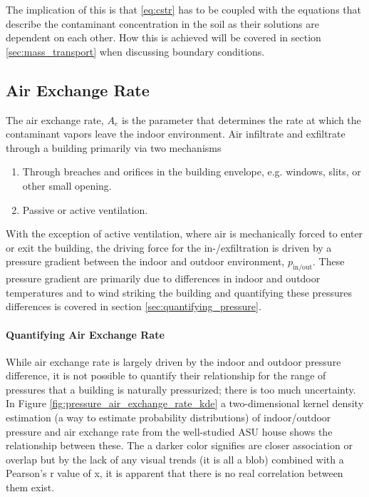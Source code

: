The implication of this is that \eqref{eq:cstr} has to be coupled with the equations that describe the contaminant concentration in the soil as their solutions are dependent on each other.
How this is achieved will be covered in section \ref{sec:mass_transport} when discussing boundary conditions.\par

\subsection{Air Exchange Rate}

The air exchange rate, $A_e$ is the parameter that determines the rate at which the contaminant vapors leave the indoor environment.
Air infiltrate and exfiltrate through a building primarily via two mechanisms
\begin{enumerate}
  \item Through breaches and orifices in the building envelope, e.g. windows, slits, or other small opening.
  \item Passive or active ventilation.
\end{enumerate}
With the exception of active ventilation, where air is mechanically forced to enter or exit the building, the driving force for the in-/exfiltration is driven by a pressure gradient between the indoor and outdoor environment, $p_\mathrm{in/out}$.
These pressure gradient are primarily due to differences in indoor and outdoor temperatures and to wind striking the building and quantifying these pressures differences is covered in section \ref{sec:quantifying_pressure}.\par

\paragraph{Quantifying Air Exchange Rate}

While air exchange rate is largely driven by the indoor and outdoor pressure difference, it is not possible to quantify their relationship for the range of pressures that a building is naturally pressurized; there is too much uncertainty.
In Figure \ref{fig:pressure_air_exchange_rate_kde} a two-dimensional kernel density estimation (a way to estimate probability distributions\cite{altman_introduction_1992}) of indoor/outdoor pressure and air exchange rate from the well-studied ASU house shows the relationship between these\cite{guo_identification_2015}.
The a darker color signifies are closer association or overlap but by the lack of any visual trends (it is all a blob) combined with a Pearson's r value of x, it is apparent that there is no real correlation between them exist.\par

